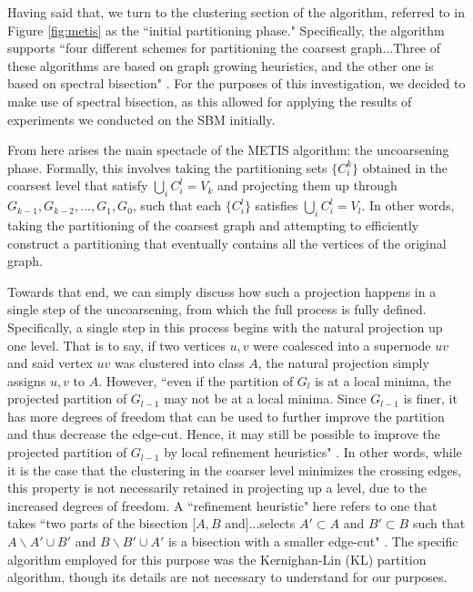 \documentclass{article}
\begin{document}
Having said that, we turn to the clustering section of the algorithm, referred to in Figure \ref{fig:metis} as the ``initial partitioning phase." Specifically, the algorithm supports ``four different schemes for partitioning the coarsest graph...Three of these algorithms are based on graph growing heuristics, and the other one is based on spectral bisection" \cite{metis}. For the purposes of this investigation, we decided to make use of spectral bisection, as this allowed for applying the results of experiments we conducted on the SBM initially. 

From here arises the main spectacle of the METIS algorithm: the uncoarsening phase. Formally, this involves taking the partitioning sets $\{C^k_i\}$ obtained in the coarsest level that satisfy $\bigcup_i C_i^l = V_k$ and projecting them up through $G_{k-1},G_{k-2},...,G_1,G_0$, such that each $\{C^l_i\}$ satisfies $\bigcup_i C^l_i = V_l$. In other words, taking the partitioning of the coarsest graph and attempting to efficiently construct a partitioning that eventually contains all the vertices of the original graph.

Towards that end, we can simply discuss how such a projection happens in a single step of the uncoarsening, from which the full process is fully defined. Specifically, a single step in this process begins with the natural projection up one level. That is to say, if two vertices $u,v$ were coalesced into a supernode $uv$ and said vertex $uv$ was clustered into class $A$, the natural projection simply assigns $u,v$ to $A$. However, ``even if the partition of $G_l$ is at a local minima, the projected partition of $G_{l-1}$ may not be at a local minima. Since $G_{l-1}$ is finer, it has more degrees of freedom that can be used to further improve the partition and thus decrease the edge-cut. Hence, it may still be possible to improve the projected partition of $G_{l-1}$ by local refinement heuristics" \cite{metis}. In other words, while it is the case that the clustering in the coarser level minimizes the crossing edges, this property is not necessarily retained in projecting up a level, due to the increased degrees of freedom. A ``refinement heuristic" here refers to one that takes ``two parts of the bisection [$A, B$ and]...selects $A'\subset A$ and $B'\subset B$ such that $A\backslash A' \cup B'$ and $B\backslash B' \cup A'$ is a bisection with a smaller edge-cut" \cite{metis}. The specific algorithm employed for this purpose was the Kernighan-Lin (KL) partition algorithm, though its details are not necessary to understand for our purposes.
\end{document}
